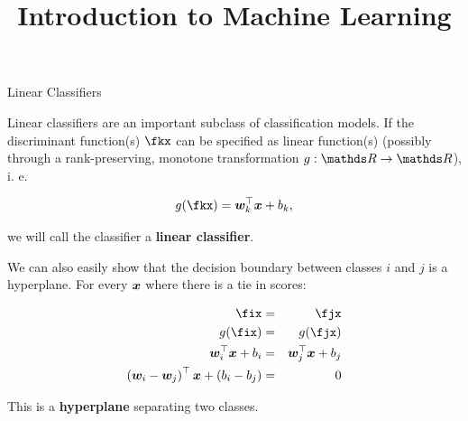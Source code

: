 



\newcommand{\titlefigure}{figure/reg_class_lin_2}
\newcommand{\learninggoals}{
\item Know the definition of a linear classifier}

\title{Introduction to Machine Learning}
\date{}


\framebreak


\begin{vbframe}{Linear Classifiers}

Linear classifiers are an important subclass of classification models. 
If the discriminant function(s) $\fkx$ can be specified as linear function(s) (possibly through a rank-preserving,
monotone transformation $g: \R \to \R$), i. e. 

$$
  g(\fkx) = \bm{w}_k^\top \xv + b_k,
$$

we will call the classifier a \textbf{linear classifier}. 
  
  

\framebreak
  

  
We can also easily show that the decision boundary between classes $i$ and $j$ is a hyperplane. For every $\bm{x}$ where there is a tie in scores: 

\begin{eqnarray*}
  \fix &=& \fjx \\
  g(\fix) &=& g(\fjx) \\
  \bm{w}_i^\top \xv + b_i &=& \bm{w}_j^\top \xv + b_j \\
  \left(\bm{w}_i - \bm{w}_j\right)^\top \xv + \left(b_i - b_j\right) &=& 0 
\end{eqnarray*}

This is a \textbf{hyperplane} separating two classes. 




\end{vbframe}


